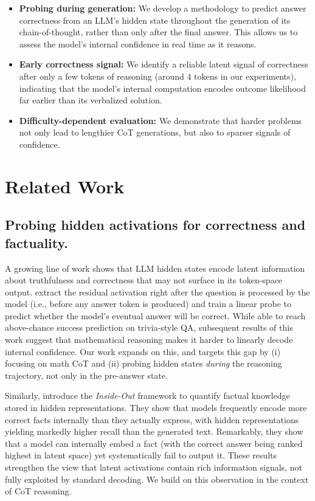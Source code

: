 \documentclass[10pt,a4paper,twocolumn]{article}
\begin{document}
\begin{itemize}[leftmargin=1em]
  \item \textbf{Probing during generation:} We develop a methodology to predict answer correctness from an LLM’s hidden state throughout the generation of its chain-of-thought, rather than only after the final answer. This allows us to assess the model’s internal confidence in real time as it reasons.
  \item \textbf{Early correctness signal:} We identify a reliable latent signal of correctness after only a few tokens of reasoning (around 4 tokens in our experiments), indicating that the model’s internal computation encodes outcome likelihood far earlier than its verbalized solution.
  \item \textbf{Difficulty-dependent evaluation:} We demonstrate that harder problems not only lead to lengthier CoT generations, but also to sparser signals of confidence.
\end{itemize}


\section{Related Work}
\label{sec:related}

\subsection{Probing hidden activations for correctness and factuality.}

A growing line of work shows that LLM hidden states encode latent information about truthfulness and correctness that may not surface in its token-space output.\cite{cencerrado2025probe} extract the residual activation right after the question is processed by the model (i.e., before any answer token is produced) and train a linear probe to predict whether the model’s eventual answer will be correct. While able to reach above-chance success prediction on trivia-style QA, subsequent results of this work suggest that mathematical reasoning makes it harder to linearly decode internal confidence. Our work expands on this, and targets this gap by (i) focusing on math CoT and (ii) probing hidden states \emph{during} the reasoning trajectory, not only in the pre-answer state.

Similarly, \cite{gekhman2024insideout} introduce the \textit{Inside-Out} framework to quantify factual knowledge stored in hidden representations. They show that models frequently encode more correct facts internally than they actually express, with hidden representations yielding markedly higher recall than the generated text. Remarkably, they show that a model can internally embed a fact (with the correct answer being ranked highest in latent space) yet systematically fail to output it. These results strengthen the view that latent activations contain rich information signals, not fully exploited by standard decoding. We build on this observation in the context of CoT reasoning.
\end{document}

